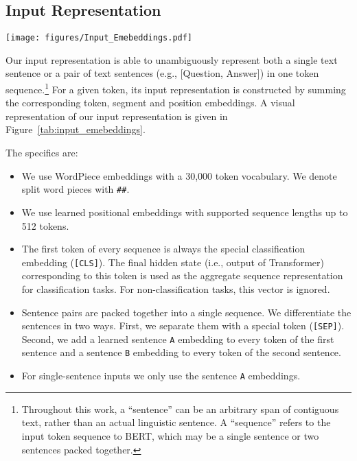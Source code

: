 \subsection{Input Representation}
\label{sec:input_representation}


\begin{figure*}[tbh]
\begin{center}
\hspace{-0.2in}
\texttt{[image: figures/Input\_Emebeddings.pdf]}
\end{center}
\caption{BERT input representation. The input embeddings is the sum of the token embeddings, the segmentation embeddings and the position embeddings.}
\label{tab:input_emebeddings}
\end{figure*}

Our input representation is able to unambiguously represent both a single text sentence or a pair of text sentences (e.g., [Question, Answer]) in one token sequence.\footnote{Throughout this work, a ``sentence'' can be an arbitrary span of contiguous text, rather than an actual linguistic sentence. A ``sequence'' refers to the input token sequence to BERT, which may be a single sentence or two sentences packed together.} For a given token, its input representation is constructed by summing the corresponding token, segment and position embeddings. A visual representation of our input representation is given in Figure~\ref{tab:input_emebeddings}. 

The specifics are:

\begin{itemize} 
\item We use WordPiece embeddings \cite{wu-etal:2016:_googl} with a 30,000 token vocabulary. We denote split word pieces with {\tt \#\#}.
\item We use learned positional embeddings with supported sequence lengths up to 512 tokens.
\item The first token of every sequence is always the special classification embedding ({\tt [CLS]}). The final hidden state (i.e., output of Transformer) corresponding to this token is used as the aggregate sequence representation for classification tasks. For non-classification tasks, this vector is ignored.
\item Sentence pairs are packed together into a single sequence. We differentiate the sentences in two ways. First, we separate them with a special token ({\tt [SEP]}). Second, we add a learned sentence {\tt A} embedding to every token of the first sentence and a sentence {\tt B} embedding to every token of the second sentence.
\item For single-sentence inputs we only use the sentence {\tt A} embeddings.
\end{itemize}

